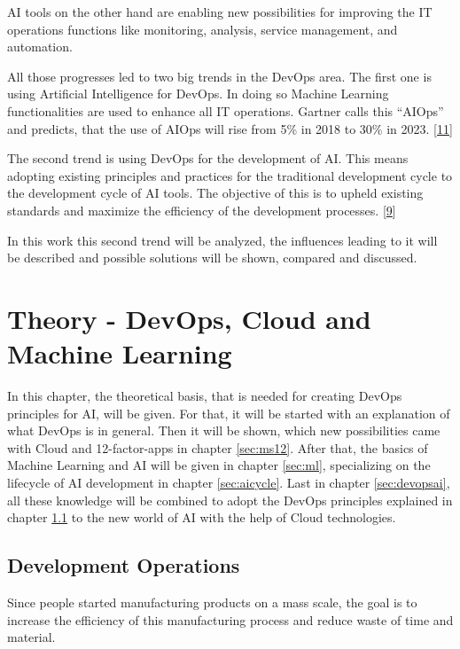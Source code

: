 \documentclass[12pt,english,a4paper,oneside,,tablecaptionabove]{scrbook}
\begin{document}
AI tools on the other hand are enabling new possibilities for improving
the IT operations functions like monitoring, analysis, service
management, and automation.

All those progresses led to two big trends in the DevOps area. The first
one is using Artificial Intelligence for DevOps. In doing so Machine
Learning functionalities are used to enhance all IT operations. Gartner
calls this \enquote{AIOps} and predicts, that the use of AIOps will rise
from 5\% in 2018 to 30\% in 2023.
{[}\protect\hyperlink{ref-SusanMoore2019}{11}{]}

The second trend is using DevOps for the development of AI. This means
adopting existing principles and practices for the traditional
development cycle to the development cycle of AI tools. The objective of
this is to upheld existing standards and maximize the efficiency of the
development processes. {[}\protect\hyperlink{ref-Dillon}{9}{]}

In this work this second trend will be analyzed, the influences leading
to it will be described and possible solutions will be shown, compared
and discussed.

\hypertarget{sec:theory}{%
\chapter{Theory - DevOps, Cloud and Machine Learning}\label{sec:theory}}

In this chapter, the theoretical basis, that is needed for creating
DevOps principles for AI, will be given. For that, it will be started
with an explanation of what DevOps is in general. Then it will be shown,
which new possibilities came with Cloud and 12-factor-apps in chapter
\ref{sec:ms12}. After that, the basics of Machine Learning and AI will
be given in chapter \ref{sec:ml}, specializing on the lifecycle of AI
development in chapter \ref{sec:aicycle}. Last in chapter
\ref{sec:devopsai}, all these knowledge will be combined to adopt the
DevOps principles explained in chapter \ref{sec:devops} to the new world
of AI with the help of Cloud technologies.

\hypertarget{sec:devops}{%
\section{Development Operations}\label{sec:devops}}

Since people started manufacturing products on a mass scale, the goal is
to increase the efficiency of this manufacturing process and reduce
waste of time and material.
\end{document}
